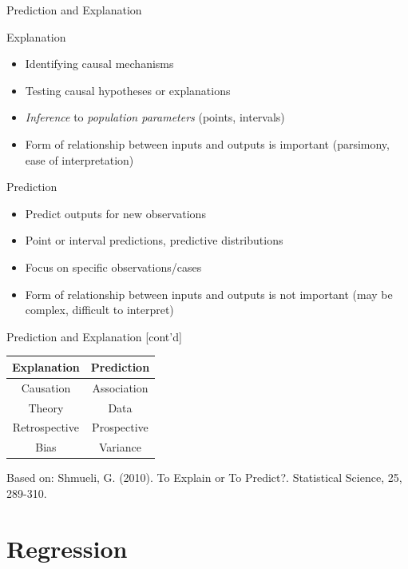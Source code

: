 \documentclass[ignorenonframetext,xcolor=x11names]{beamer}
\begin{document}
\begin{frame}[label=full]{Prediction and Explanation}
\begin{block}{Explanation}
  \begin{itemize}
     \item Identifying causal mechanisms
     \item Testing causal hypotheses or explanations
     \item \emph{Inference} to \emph{population parameters} (points, intervals)
     \item Form of relationship between inputs and outputs is important (parsimony, ease of interpretation)
  \end{itemize}
\end{block}

\begin{block}{Prediction}
  \begin{itemize}
     \item Predict outputs for new observations
     \item Point or interval predictions, predictive distributions
     \item Focus on specific observations/cases
     \item Form of relationship between inputs and outputs is not important (may be complex, difficult to interpret)
  \end{itemize}
\end{block}
\end{frame}

\begin{frame}[label=full]{Prediction and Explanation \small [cont'd]}
\begin{center}
\renewcommand{\arraystretch}{1.25}

\begin{tabular}{c|c} \hline
\textbf{Explanation} & \textbf{Prediction} \\ \hline
Causation & Association \\
Theory & Data \\
Retrospective & Prospective \\
Bias & Variance \\ \hline
\end{tabular}
\end{center}
\vspace{5mm}
\small{Based on: Shmueli, G. (2010). To Explain or To Predict?. Statistical Science, 25, 289-310.}
\end{frame}

\section{Regression}
\end{document}

